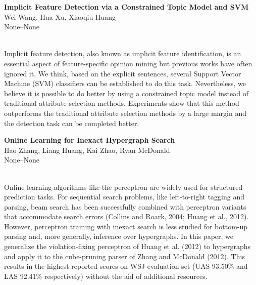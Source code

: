 \documentclass[twoside,makeidx]{book}
\begin{document}
\par\vspace{2em}\noindent%
\begin{minipage}{\linewidth}%
\begin{center}
\textbf{\normalsize Implicit Feature Detection via a Constrained Topic Model and SVM}\\
\normalsize  Wei Wang,  Hua Xu,  Xiaoqiu Huang\\
{\small None--None}\\
\end{center}
\end{minipage}\\[0.5em]
\nopagebreak%
\noindent%
{\small Implicit feature detection, also known as implicit feature identification, is an essential aspect of feature-specific opinion mining but previous works have often ignored it. We think, based on the explicit sentences, several Support Vector Machine (SVM) classifiers can be established to do this task. Nevertheless, we believe it is possible to do better by using a constrained topic model instead of traditional attribute selection methods. Experiments show that this method outperforms the traditional attribute selection methods by a large margin and the detection task can be completed better.}
\par\vspace{2em}\noindent%
\begin{minipage}{\linewidth}%
\begin{center}
\textbf{\normalsize Online Learning for Inexact Hypergraph Search}\\
\normalsize  Hao Zhang,  Liang Huang,  Kai Zhao,  Ryan McDonald\\
{\small None--None}\\
\end{center}
\end{minipage}\\[0.5em]
\nopagebreak%
\noindent%
{\small Online learning algorithms like the perceptron are widely used for structured prediction tasks. For sequential search problems, like left-to-right tagging and parsing, beam search has been successfully combined with perceptron variants that accommodate search errors (Collins and Roark, 2004; Huang et al., 2012). However, perceptron training with inexact search is less studied for bottom-up parsing and, more generally, inference over hypergraphs. In this paper, we generalize the violation-fixing perceptron of Huang et al. (2012) to hypergraphs and apply it to the cube-pruning parser of Zhang and McDonald (2012). This results in the highest reported scores on WSJ evaluation set (UAS 93.50\% and LAS 92.41\% respectively) without the aid of additional resources.}
\clearpage
\end{document}
